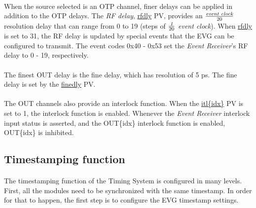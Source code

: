 \documentclass[openany]{article}
\begin{document}
		\paragraph{} When the source selected is an OTP channel, finer delays can be applied in addition to the OTP delays. The \emph{RF delay}, \hyperref[pvgroup:evre-out]{rfdly} PV, provides an \(\frac{\emph{event clock}}{20}\) resolution delay that can range from 0 to 19 (steps of \(\frac{\emph{1}}{20}\) \emph{event clock}). When \hyperref[pvgroup:evre-out]{rfdly} is set to 31, the RF delay is updated by special events that the EVG can be configured to transmit. The event codes 0x40 - 0x53 set the \emph{Event Receiver}'s RF delay to 0 - 19, respectively.
		\paragraph{} The finest OUT delay is the fine delay, which has resolution of 5 ps. The fine delay is set by the \hyperref[pvgroup:evre-out]{finedly} PV.
		\paragraph{} The OUT channels also provide an interlock function. When the \hyperref[pvgroup:evre-out]{itl\{idx\}} PV is set to 1, the interlock function is enabled. Whenever the \emph{Event Receiver} interlock input status is asserted, and the OUT\{idx\} interlock function is enabled, OUT\{idx\} is inhibited.

	\subsection{Timestamping function}
		\paragraph{} The timestamping function of the Timing System is configured in many levels. First, all the modules need to be synchronized with the same timestamp. In order for that to happen, the first step is to configure the EVG timestamp settings.
\end{document}
